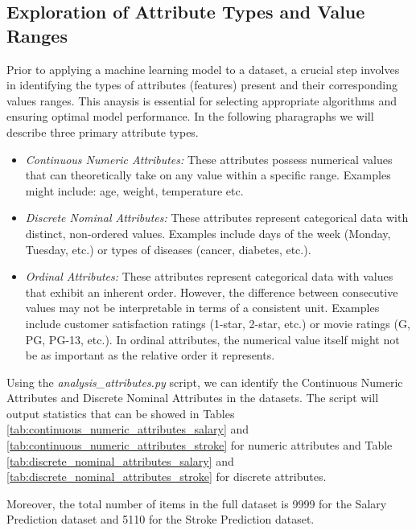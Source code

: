 \documentclass[runningheads]{paper}
\begin{document}
\subsection{Exploration of Attribute Types and Value Ranges}
Prior to applying a machine learning model to a dataset, a crucial step involves
in identifying the types of attributes (features) present and their corresponding
values ranges. This anaysis is essential for selecting appropriate algorithms 
and ensuring optimal model performance. In the following pharagraphs we will
describe three primary attribute types.
\begin{itemize}
    \item \textit{Continuous Numeric Attributes:}
    These attributes possess numerical values that can theoretically take on any 
    value within a specific range. Examples might include: age, weight, temperature etc.
    \item \textit{Discrete Nominal Attributes:}
    These attributes represent categorical data with distinct, non-ordered values. 
    Examples include days of the week (Monday, Tuesday, etc.) or types of diseases 
    (cancer, diabetes, etc.).
    \item \textit{Ordinal Attributes:}
    These attributes represent categorical data with values that exhibit an inherent 
    order. However, the difference between consecutive values may not be interpretable 
    in terms of a consistent unit.  Examples include customer satisfaction ratings 
    (1-star, 2-star, etc.) or movie ratings (G, PG, PG-13, etc.). In ordinal 
    attributes, the numerical value itself might not be as important as the relative 
    order it represents.
\end{itemize}

Using the \textit{analysis\_attributes.py} script, we can identify the 
Continuous Numeric Attributes and Discrete Nominal Attributes in the  
datasets. The script will output statistics that can be showed in Tables 
\ref{tab:continuous_numeric_attributes_salary} and 
\ref{tab:continuous_numeric_attributes_stroke} for numeric attributes and
Table \ref{tab:discrete_nominal_attributes_salary} and 
\ref{tab:discrete_nominal_attributes_stroke} for discrete attributes.

Moreover, the total number of items in the full dataset is 9999 for the Salary
Prediction dataset and 5110 for the Stroke Prediction dataset.
\end{document}

